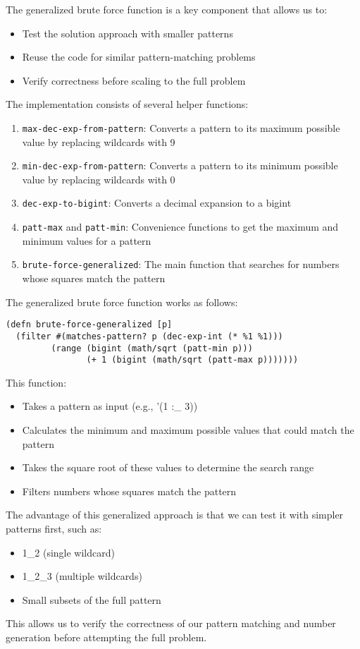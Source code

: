 The generalized brute force function is a key component that allows us to:
\begin{itemize}
\item Test the solution approach with smaller patterns
\item Reuse the code for similar pattern-matching problems
\item Verify correctness before scaling to the full problem
\end{itemize}

The implementation consists of several helper functions:

\begin{enumerate}
\item \texttt{max-dec-exp-from-pattern}: Converts a pattern to its maximum possible value by replacing wildcards with 9
\item \texttt{min-dec-exp-from-pattern}: Converts a pattern to its minimum possible value by replacing wildcards with 0
\item \texttt{dec-exp-to-bigint}: Converts a decimal expansion to a bigint
\item \texttt{patt-max} and \texttt{patt-min}: Convenience functions to get the maximum and minimum values for a pattern
\item \texttt{brute-force-generalized}: The main function that searches for numbers whose squares match the pattern
\end{enumerate}

The generalized brute force function works as follows:

\begin{lstlisting}
(defn brute-force-generalized [p]
  (filter #(matches-pattern? p (dec-exp-int (* %1 %1))) 
         (range (bigint (math/sqrt (patt-min p))) 
                (+ 1 (bigint (math/sqrt (patt-max p)))))))
\end{lstlisting}

This function:
\begin{itemize}
\item Takes a pattern as input (e.g., '(1 :\_ 3))
\item Calculates the minimum and maximum possible values that could match the pattern
\item Takes the square root of these values to determine the search range
\item Filters numbers whose squares match the pattern
\end{itemize}

The advantage of this generalized approach is that we can test it with simpler patterns first, such as:
\begin{itemize}
\item 1\_2 (single wildcard)
\item 1\_2\_3 (multiple wildcards)
\item Small subsets of the full pattern
\end{itemize}

This allows us to verify the correctness of our pattern matching and number generation before attempting the full problem.

